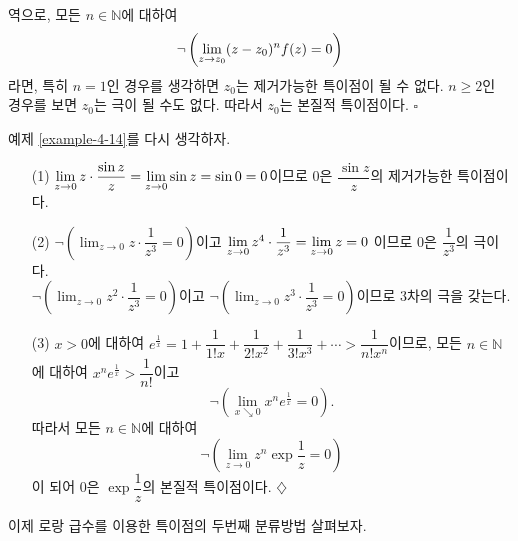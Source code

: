 역으로, 모든 $n\in\mathbb N$에 대하여
\[
 \neg\left( \lim\limits_{z\to z_0} (z-z_0)^{n} f(z) = 0 \right)
\]
라면, 특히 $n=1$인 경우를 생각하면 $z_0$는 제거가능한 특이점이 될 수 없다.
$n\ge2$인 경우를 보면 $z_0$는 극이 될 수도 없다.
따라서 $z_0$는 본질적 특이점이다. \hfill $\square$

예제 \ref{example-4-14}를 다시 생각하자.

\begin{saltexample}{}{}\label{example-4-15}

\begin{itemize}
\item[(1)] $\lim\limits_{z\to0} z \cdot \displaystyle\frac{\sin z}z = \lim\limits_{z\to0} \sin z 
= \sin 0 = 0$이므로 $0$은 $\dfrac{\sin z}z$의 제거가능한 특이점이다.
\item[(2)] $\neg\left(\lim_{z\to 0} z\cdot \dfrac1{z^3} = 0 \right)$이고
$\lim\limits_{z\to 0} z^4 \cdot \displaystyle\frac1{z^3} = \lim\limits_{z\to0} z = 0$ 이므로
$0$은 $\dfrac1{z^3}$의 극이다. \\
$\neg\left(\lim_{z\to 0} z^2\cdot \dfrac1{z^3} = 0 \right)$이고
$\neg\left(\lim_{z\to 0} z^3\cdot \dfrac1{z^3} = 0 \right)$이므로
$3$차의 극을 갖는다.
\item[(3)] $x>0$에 대하여
$e^{\frac1x} = 1 + \dfrac1{1!x} + \dfrac1{2!x^2} + \dfrac1{3!x^3} + \cdots
> \dfrac1{n!x^n}$이므로,
모든 $n\in\mathbb N$에 대하여 $x^ne^{\frac1x} > \dfrac1{n!}$이고
\[
\neg\left(\lim_{x\searrow 0} x^ne^{\frac1x} = 0 \right). 
\]
따라서  모든 $n\in\mathbb N$에 대하여
\[
\neg\left(\lim_{z\to 0} z^n\exp \frac1z = 0 \right)
\]
이 되어 $0$은 $\exp \dfrac 1z$의 본질적 특이점이다. 
\hfill $\diamondsuit$
\end{itemize}

이제 로랑 급수를 이용한 특이점의 두번째 분류방법 살펴보자.
\end{saltexample}

